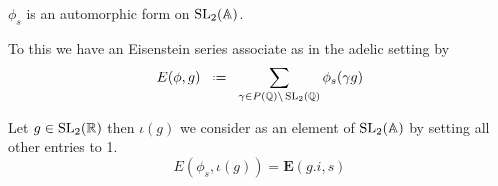  \begin{Lemma}
 	\(\phi_s\) is an automorphic form on \(\SL_2(\A)\).
 \end{Lemma}
 
 To this we have an Eisenstein series associate as in the adelic setting by 
 \[E(\phi, g) \defeq \sum_{\gamma\in P(\Q)\backslash \SL_2(\Q)} \phi_s(\gamma g) \]

\begin{Lemma}
	Let \(g\in \SL_2(\R)\) then \(\iota(g)\) we consider as an element of \(\SL_2(\A)\) by setting all other entries to 1. 
	\[E(\phi_s, \iota(g)) = \mathbf{E}(g.i,s)\]
\end{Lemma}





